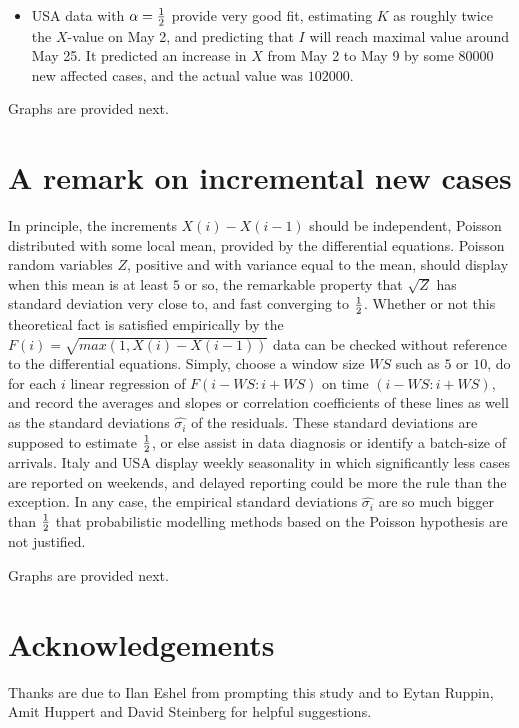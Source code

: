 \documentclass{article}
\begin{document}
{\begin{itemize}
\item USA data with $\alpha={1 \over 2}$ provide very good fit, estimating $K$ as roughly twice the $X$-value on May 2, and predicting that $I$ will reach maximal value around May 25. It predicted an increase in $X$ from May 2 to May 9 by some $80000$ new affected cases, and the actual value was $102000$.

\end{itemize}

Graphs are provided next.

\section{A remark on incremental new cases} \label{More}

In principle, the increments $X(i)-X(i-1)$ should be independent, Poisson distributed with some local mean, provided by the differential equations. Poisson random variables $Z$, positive and with variance equal to the mean, should display when this mean is at least $5$ or so, the remarkable property that $\sqrt{Z}$ has standard deviation very close to, and fast converging to ${1 \over 2}$. Whether or not this theoretical fact is satisfied empirically by the $F(i)=\sqrt{max(1,X(i)-X(i-1))}$ data can be checked without reference to the differential equations. Simply, choose a window size $WS$ such as $5$ or $10$, do for each $i$ linear regression of $F(i-WS:i+WS)$ on time $(i-WS:i+WS)$, and record the averages and slopes or correlation coefficients of these lines as well as the standard deviations $\hat{\sigma_i}$ of the residuals. These standard deviations are supposed to estimate ${1 \over 2}$, or else assist in data diagnosis or identify a batch-size of arrivals. Italy and USA display weekly seasonality in which significantly less cases are reported on weekends, and delayed reporting could be more the rule than the exception. In any case, the empirical standard deviations $\hat{\sigma_i}$ are so much bigger than ${1 \over 2}$ that probabilistic modelling methods based on the Poisson hypothesis are not justified.

Graphs are provided next.



\section*{Acknowledgements}

Thanks are due to Ilan Eshel from prompting this study and to Eytan Ruppin, Amit Huppert and David Steinberg for helpful suggestions.

}
\end{document}

